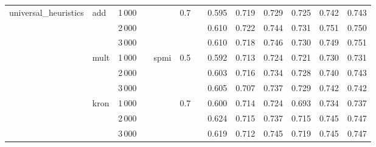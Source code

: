 \begin{tabular}{lllllllrrrrrr}
universal\_heuristics & add & 1\,000 &   &      & 0.7 &   &        0.595 &         0.719 &           0.729 &            0.725 &             0.742 &       0.743 \\
       & {} & 2\,000 &   &      &     &   &        0.610 &         0.722 &           0.744 &            0.731 &             0.751 &       0.750 \\
       & {} & 3\,000 &   &      &     &   &        0.610 &         0.718 &           0.746 &            0.730 &             0.749 &       0.751 \\
       & mult & 1\,000 &   & spmi & 0.5 &   &        0.592 &         0.713 &           0.724 &            0.721 &             0.730 &       0.731 \\
       & {} & 2\,000 &   &      &     &   &        0.603 &         0.716 &           0.734 &            0.728 &             0.740 &       0.743 \\
       & {} & 3\,000 &   &      &     &   &        0.605 &         0.707 &           0.737 &            0.729 &             0.742 &       0.742 \\
       & kron & 1\,000 &   &      & 0.7 &   &        0.600 &         0.714 &           0.724 &            0.693 &             0.734 &       0.737 \\
       & {} & 2\,000 &   &      &     &   &        0.624 &         0.715 &           0.737 &            0.715 &             0.745 &       0.747 \\
       & {} & 3\,000 &   &      &     &   &        0.619 &         0.712 &           0.745 &            0.719 &             0.745 &       0.747 \\
\bottomrule
\end{tabular}
